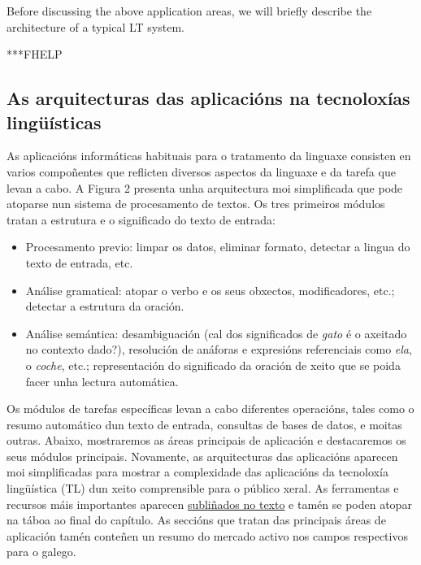 \begin{multicols}{2}
Before discussing the above application areas, we will briefly describe the architecture of a typical LT system.

***FHELP

\subsection[As arquitecturas das aplicacións na tecnoloxías lingüísticas]{As arquitecturas das \newline aplicacións na tecnoloxías lingüísticas}

    As aplicacións informáticas habituais para o tratamento da linguaxe consisten en varios compoñentes que reflicten diversos aspectos da linguaxe e da tarefa que levan a cabo. A Figura 2 presenta unha arquitectura moi simplificada que pode atoparse nun sistema de procesamento de textos. Os tres primeiros módulos tratan a estrutura e o significado do texto de entrada:

\begin{itemize}
      \item Procesamento previo: limpar os datos, eliminar formato, detectar a lingua do texto de entrada, etc.
      \item Análise gramatical: atopar o verbo e os seus obxectos, modificadores, etc.; detectar a estrutura da oración.
      \item Análise semántica: desambiguación (cal dos significados de \textit{gato} é o axeitado no contexto dado?), resolución de anáforas e expresións referenciais como \textit{ela}, o \textit{coche}, etc.; representación do significado da oración de xeito que se poida facer unha lectura automática.
\end{itemize}


    Os módulos de tarefas específicas levan a cabo diferentes operacións, tales como o resumo automático dun texto de entrada, consultas de bases de datos, e moitas outras. Abaixo, mostraremos as áreas principais de aplicación e destacaremos os seus módulos principais. Novamente, as arquitecturas das aplicacións aparecen moi simplificadas para mostrar a complexidade das aplicacións da tecnoloxía lingüística (TL) dun xeito comprensible para o público xeral. As ferramentas e recursos máis importantes aparecen \uline{subliñados no texto} e tamén se poden atopar na táboa ao final do capítulo. As seccións que tratan das principais áreas de aplicación tamén conteñen un resumo do mercado activo nos campos respectivos para o galego.


\end{multicols}
